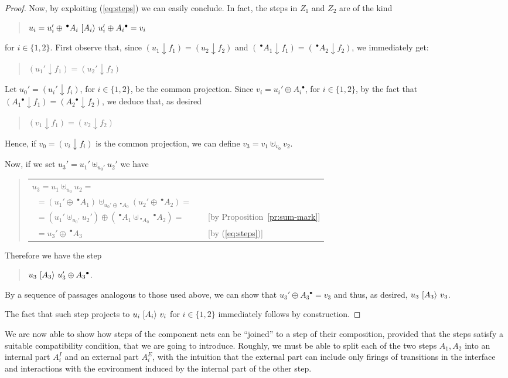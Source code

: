 \documentclass{LMCS}
\newcommand{\mjoin}{\ensuremath{\uplus}}
\newcommand{\res}[2]{\ensuremath{({#1}\!\downarrow\!{#2})}}
\newcommand{\pre}[1][(\cdot)]{\ensuremath{\!~^\bullet{#1}}}
\newcommand{\post}[1][(\cdot)]{\ensuremath{{#1} {^\bullet}}}
\newcommand{\trans}[1]{\ensuremath{\ [\/{#1}\/\rangle}\ }
\begin{document}
\begin{proof}
  Now, by exploiting (\ref{eq:steps}) we can easily conclude. In fact, the
  steps in $Z_1$ and $Z_2$ are of the kind
  \begin{quote}
    $u_i = u_i' \oplus \pre[A_i] \trans{A_i} u_i' \oplus \post[A_i] = v_i$
  \end{quote}
  for $i \in \{1,2\}$. First observe that, since $\res{u_1}{f_1} =
  \res{u_2}{f_2}$ and $\res{\pre[A_1]}{f_1} = \res{\pre[A_2]}{f_2}$, we
  immediately get: 
  \begin{quote}
    $\res{u_1'}{f_1} = \res{u_2'}{f_2}$
  \end{quote}
  Let $u_0' = \res{u_i'}{f_i}$, for $i \in  \{ 1,2\}$, be the common projection.
Since $v_i = u_i' \oplus
  \post[A_i]$, for $i \in \{1,2\}$, by the fact that $\res{\post[A_1]}{f_1} =
  \res{\post[A_2]}{f_2}$, we deduce that, as desired
  \begin{quote}
    $\res{v_1}{f_1} = \res{v_2}{f_2}$
  \end{quote}
  Hence, if $v_0 = \res{v_i}{f_i}$ is the common projection, we can define
  $v_3 = v_1 \mjoin_{v_0} v_2$.

  Now, if we set $u_3' = u_1' \mjoin_{u_0'} u_2'$ we have
    \begin{quote}
      \begin{tabular}{lll}
        $u_3 = u_1 \mjoin_{u_0} u_2 =$\\
\ \quad $= (u_1' \oplus \pre[A_1])  \mjoin_{u_0' \oplus \pre[A_0]} (u_2'
        \oplus \pre[A_2]) =$
        & \quad & \\
\ \quad $= (u_1'  \mjoin_{u_0'} u_2')  \oplus (\pre[A_1]  \mjoin_{\pre[A_0]}
        \pre[A_2]) =$ 
        & \quad & [by Proposition~\ref{pr:sum-mark}]\\
\ \quad  $= u_3' \oplus \pre[A_3]$ & &
        [by (\ref{eq:steps})]
      \end{tabular}
    \end{quote}  
    Therefore we have the step
    \begin{quote}
      $u_3 \trans{A_3} u_3' \oplus \post[A_3]$.
    \end{quote}
    By a sequence of passages analogous to those used above, we can show that
    $u_3' \oplus \post[A_3] = v_3$ and thus, as desired,
    $u_3 \trans{A_3} v_3$.

    The fact that such step projects to $u_i \trans{A_i} v_i$ for $i \in \{
    1,2\}$ immediately follows by construction.
\end{proof}

We are now able to show how steps of the component nets can be ``joined''
to a step of their composition, provided that the steps satisfy a
suitable compatibility condition, that we are going to introduce.
Roughly, we must be able to split each of the two steps $A_1,A_2$ into
an internal part $A_i^I$ and an external part $A_i^E$, with the
intuition that the external part can include only firings of
transitions in the interface and interactions with the environment
induced by the internal part of the other step.
\end{document}
